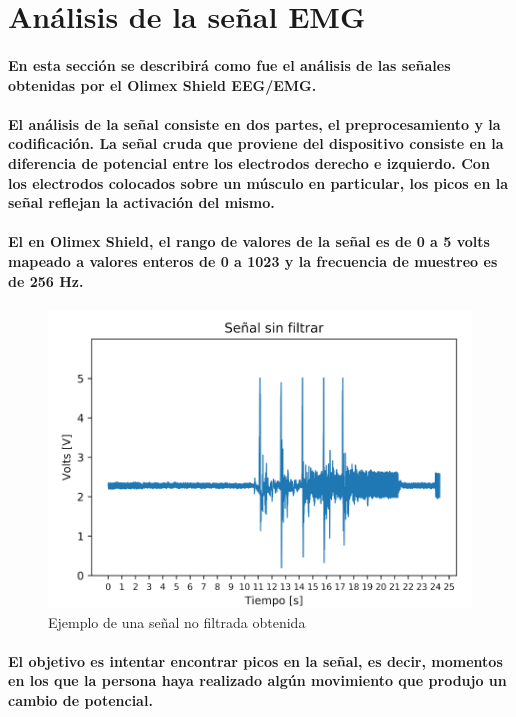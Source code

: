 \documentclass{article}
\begin{document}
\section{Análisis de la señal EMG}
\paragraph{
En esta sección se describirá como fue el análisis de las señales obtenidas por el Olimex Shield EEG/EMG.
}
\paragraph{
El análisis de la señal consiste en dos partes, el preprocesamiento y la codificación. La señal cruda que proviene del dispositivo consiste en la diferencia de potencial entre los electrodos derecho e izquierdo. Con los electrodos colocados sobre un músculo en particular, los picos en la señal reflejan la activación del mismo.
}

\paragraph{
El en Olimex Shield, el rango de valores de la señal es de 0 a 5 volts mapeado a valores enteros de 0 a 1023 y la frecuencia de muestreo es de 256 Hz.
}

\begin{figure}[ht]
    \centering
    \includegraphics[width=\textwidth]{no-filter.png}%
    \caption{Ejemplo de una señal no filtrada obtenida}
    \label{fig:no-filter}
\end{figure}

\paragraph{
El objetivo es intentar encontrar picos en la señal, es decir, momentos en los que la persona haya realizado algún movimiento que produjo un cambio de potencial.
}
\end{document}
